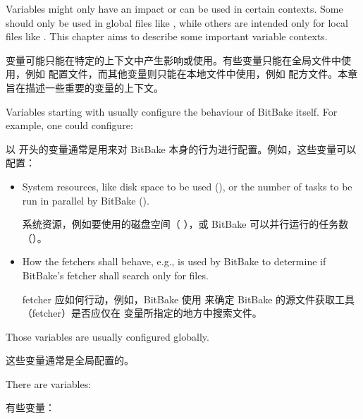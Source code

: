 
Variables might only have an impact or can be used in certain contexts. Some should only be used in global files like , while others are intended only for local files like . This chapter aims to describe some important variable contexts.

变量可能只能在特定的上下文中产生影响或使用。有些变量只能在全局文件中使用，例如  配置文件，而其他变量则只能在本地文件中使用，例如  配方文件。本章旨在描述一些重要的变量的上下文。

Variables starting with  usually configure the behaviour of BitBake itself. For example, one could configure:

以  开头的变量通常是用来对 BitBake 本身的行为进行配置。例如，这些变量可以配置：

\begin{itemize}
\setlength\itemsep{1.0em}
\item System resources, like disk space to be used (), or the number of tasks to be run in parallel by BitBake ().

\medskip
系统资源，例如要使用的磁盘空间（ ），或 BitBake 可以并行运行的任务数\linebreak（）。

\item How the fetchers shall behave, e.g.,  is used by BitBake to determine if BitBake's fetcher shall search only  for files.

\medskip
fetcher 应如何行动，例如，BitBake 使用  来确定 BitBake 的源文件获取工具（fetcher）是否应仅在  变量所指定的地方中搜索文件。
\end{itemize}

Those variables are usually configured globally.

这些变量通常是全局配置的。

There are variables:

有些变量：

